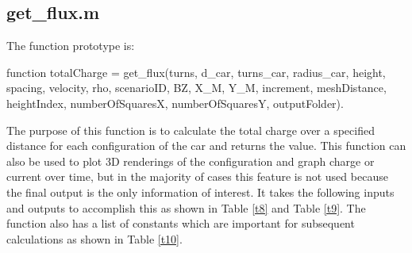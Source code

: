 \subsection{get\_flux.m}
The function prototype is:
\begin{center}
function totalCharge = get\_flux(turns, d\_car, turns\_car, radius\_car, height, spacing, velocity, rho, scenarioID, BZ, X\_M, Y\_M, increment, meshDistance, heightIndex, numberOfSquaresX, numberOfSquaresY, outputFolder).
\end{center}
The purpose of this function is to calculate the total charge over a specified distance for each configuration 
of the car and returns the value. This function can also be used to plot 3D renderings of the configuration 
and graph charge or current over time, but in the majority of cases this feature is not used because the 
final output is the only information of interest. It takes the following inputs and outputs to accomplish 
this as shown in Table \ref{t8} and Table \ref{t9}. The function also has a list of constants which are 
important for subsequent calculations as shown in Table \ref{t10}.

